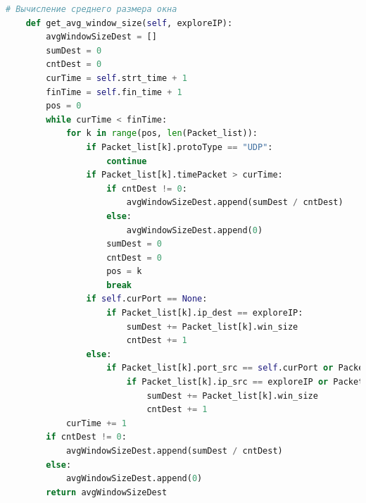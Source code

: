 \documentclass[spec, och, diploma]{SCWorks}
\begin{document}
\begin{lstlisting}[language=Python]
    # Вычисление среднего размера окна
    def get_avg_window_size(self, exploreIP):
        avgWindowSizeDest = []
        sumDest = 0
        cntDest = 0
        curTime = self.strt_time + 1
        finTime = self.fin_time + 1
        pos = 0
        while curTime < finTime:
            for k in range(pos, len(Packet_list)):
                if Packet_list[k].protoType == "UDP":
                    continue
                if Packet_list[k].timePacket > curTime:
                    if cntDest != 0:
                        avgWindowSizeDest.append(sumDest / cntDest)
                    else:
                        avgWindowSizeDest.append(0)
                    sumDest = 0
                    cntDest = 0 
                    pos = k
                    break
                if self.curPort == None:
                    if Packet_list[k].ip_dest == exploreIP:
                        sumDest += Packet_list[k].win_size
                        cntDest += 1
                else:
                    if Packet_list[k].port_src == self.curPort or Packet_list[k].port_dest == self.curPort:
                        if Packet_list[k].ip_src == exploreIP or Packet_list[k].ip_dest == exploreIP:
                            sumDest += Packet_list[k].win_size
                            cntDest += 1
            curTime += 1
        if cntDest != 0:
            avgWindowSizeDest.append(sumDest / cntDest)
        else:
            avgWindowSizeDest.append(0)
        return avgWindowSizeDest


\end{lstlisting}
\end{document}
